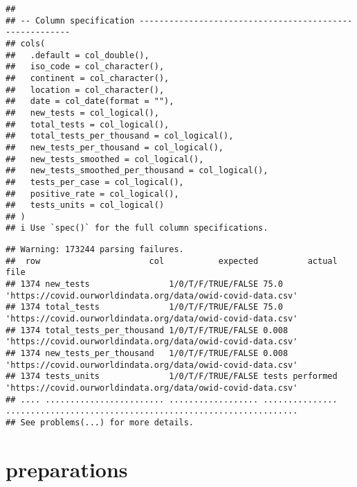 \documentclass[
]{article}
\begin{document}
\begin{verbatim}
## 
## -- Column specification --------------------------------------------------------
## cols(
##   .default = col_double(),
##   iso_code = col_character(),
##   continent = col_character(),
##   location = col_character(),
##   date = col_date(format = ""),
##   new_tests = col_logical(),
##   total_tests = col_logical(),
##   total_tests_per_thousand = col_logical(),
##   new_tests_per_thousand = col_logical(),
##   new_tests_smoothed = col_logical(),
##   new_tests_smoothed_per_thousand = col_logical(),
##   tests_per_case = col_logical(),
##   positive_rate = col_logical(),
##   tests_units = col_logical()
## )
## i Use `spec()` for the full column specifications.
\end{verbatim}

\begin{verbatim}
## Warning: 173244 parsing failures.
##  row                      col           expected          actual                                                        file
## 1374 new_tests                1/0/T/F/TRUE/FALSE 75.0            'https://covid.ourworldindata.org/data/owid-covid-data.csv'
## 1374 total_tests              1/0/T/F/TRUE/FALSE 75.0            'https://covid.ourworldindata.org/data/owid-covid-data.csv'
## 1374 total_tests_per_thousand 1/0/T/F/TRUE/FALSE 0.008           'https://covid.ourworldindata.org/data/owid-covid-data.csv'
## 1374 new_tests_per_thousand   1/0/T/F/TRUE/FALSE 0.008           'https://covid.ourworldindata.org/data/owid-covid-data.csv'
## 1374 tests_units              1/0/T/F/TRUE/FALSE tests performed 'https://covid.ourworldindata.org/data/owid-covid-data.csv'
## .... ........................ .................. ............... ...........................................................
## See problems(...) for more details.
\end{verbatim}

\hypertarget{preparations}{%
\section{preparations}\label{preparations}}
\end{document}
